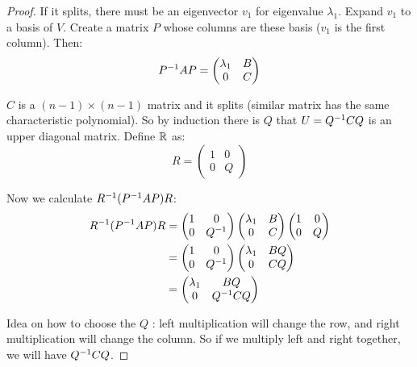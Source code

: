 \begin{proof}
    If it splits, there must be an eigenvector $v_1$ for eigenvalue $\lambda_1$. Expand $v_1$ to a basis of $V$. Create a matrix $P$ whose columns are these basis ($v_1$ is the first column). Then:
    \begin{equation*}
        {P}^{-1} A P = \begin{pmatrix}
            \lambda_1 & B \\
            0 & C
        \end{pmatrix}
    \end{equation*}
    
    $C$ is a $(n-1) \times (n-1)$ matrix and it splits (similar matrix has the same characteristic polynomial). So by induction there is $Q$ that $U= {Q}^{-1} C Q$ is an upper diagonal matrix. Define $\mathbb{R}$ as:
    \begin{equation*}
        R = \begin{pmatrix}
            1 & 0 \\
            0 & Q
        \end{pmatrix}
    \end{equation*}
    
    Now we calculate ${R}^{-1} ({P}^{-1} A P) R$:
    \begin{equation*}
        \begin{aligned}
            {R}^{-1} ({P}^{-1} A P) R  &= \begin{pmatrix}
                1 & 0 \\
                0 & {Q}^{-1}
            \end{pmatrix} \begin{pmatrix}
                \lambda_1 & B \\
                0 & C
            \end{pmatrix} \begin{pmatrix}
                1 & 0 \\
                0 & Q
            \end{pmatrix} \\
            & = \begin{pmatrix}
                1 & 0 \\
                0 & {Q}^{-1}
            \end{pmatrix} \begin{pmatrix}
                \lambda_1 & B Q \\
                0 & C Q
            \end{pmatrix} \\
            &= \begin{pmatrix}
                \lambda_1 & BQ \\
                0 & {Q}^{-1} C Q
            \end{pmatrix}
        \end{aligned}     
    \end{equation*}
    
    Idea on how to choose the $Q$ : left multiplication will change the row, and right multiplication will change the column. So if we multiply left and right together, we will have ${Q}^{-1} C Q$.
\end{proof}

